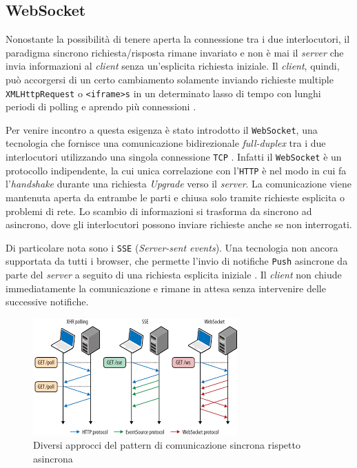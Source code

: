 \subsection{WebSocket}
\label{subsec:httpWebsocket}

Nonostante la possibilità di tenere aperta la connessione tra i due interlocutori, il paradigma sincrono richiesta/risposta rimane invariato e non è mai il \textit{server} che invia informazioni al \textit{client} senza un'esplicita richiesta iniziale.
Il \textit{client}, quindi, può accorgersi di un certo cambiamento solamente inviando richieste multiple \verb+XMLHttpRequest+ o \verb+<iframe>s+ in un determinato lasso di tempo con lunghi periodi di polling e aprendo più connessioni \cite{Rfc6202}.

Per venire incontro a questa esigenza è stato introdotto il \verb+WebSocket+, una tecnologia che fornisce una comunicazione bidirezionale \textit{full-duplex} tra i due interlocutori utilizzando una singola connessione \verb+TCP+ \cite{Rfc6455}.
Infatti il \verb+WebSocket+ è un protocollo indipendente, la cui unica correlazione con l'\verb+HTTP+ è nel modo in cui fa l'\textit{handshake} durante una richiesta \textit{Upgrade} verso il \textit{server}.
La comunicazione viene mantenuta aperta da entrambe le parti e chiusa solo tramite richieste esplicita o problemi di rete.
Lo scambio di informazioni si trasforma da sincrono ad asincrono, dove gli interlocutori possono inviare richieste anche se non interrogati.

Di particolare nota sono i \verb+SSE+ (\textit{Server-sent events}).
Una tecnologia non ancora supportata da tutti i browser, che permette l'invio di notifiche \verb+Push+ asincrone da parte del \textit{server} a seguito di una richiesta esplicita iniziale \cite{SSE}.
Il \textit{client} non chiude immediatamente la comunicazione e rimane in attesa senza intervenire delle successive notifiche.

\begin{figure}[H]
  \centering
  \includegraphics[width=0.95\linewidth, keepaspectratio]{websocket}
  \caption{Diversi approcci del pattern di comunicazione sincrona rispetto asincrona}
  \label{fig:websocket}
\end{figure}
